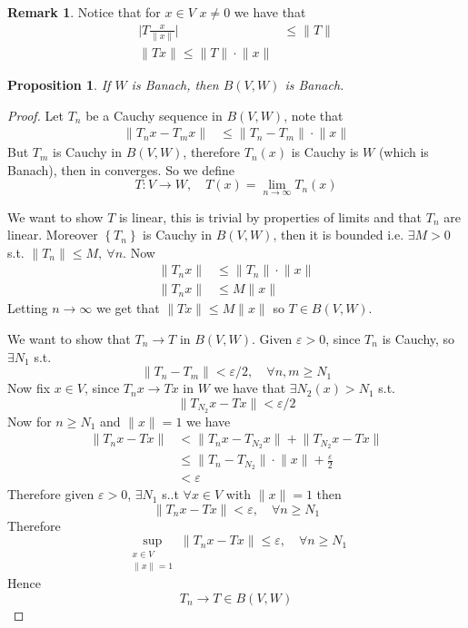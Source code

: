 \documentclass[11pt,a4paper]{article}
\theoremstyle{definition}
\newtheorem{remark}[definition]{Remark}
\theoremstyle{plain}
\newtheorem{proposition}[definition]{Proposition}
\theoremstyle{remark}
\renewcommand{\set}[1]{\left\{ #1 \right\}}
\newcommand{\abs}[1]{\lvert #1 \rvert}
\newcommand{\norm}[1]{\lVert #1 \rVert}
\newcommand{\1}{\mathbbm{1}}
\begin{document}
\begin{remark}
    Notice that for $x \in V$ $x \ne 0$ we have that 
    \begin{align*}
        \abs{T \frac{x}{\norm{x}}} &\le \norm{T} \\
        \norm{Tx} \le \norm{T} \cdot \norm{x}
    \end{align*}
\end{remark}

\begin{proposition}
    If $W$ is Banach, then $B(V, W)$ is Banach.
\end{proposition}

\begin{proof}
    Let $T_n$ be a Cauchy sequence in $B(V,W)$, note that 
    \begin{align*}
        \norm{T_n x - T_m x} &\le \norm{T_n - T_m} \cdot \norm{x}
    \end{align*}
    But $T_m$ is Cauchy in $B(V,W)$, therefore $T_n(x)$ is Cauchy is $W$ (which is Banach), then in converges. So we define 
    $$T \colon V \to W, \quad T(x) = \lim_{n \to \infty} T_n(x)$$

    We want to show $T$ is linear, this is trivial by properties of limits and that $T_n$ are linear. Moreover $\set{T_n}$ is Cauchy 
    in $B(V,W)$, then it is bounded i.e. $\exists M > 0$ s.t. $\norm{T_n} \le M, \ \forall n$. Now 
    \begin{align*}
        \norm{T_nx} &\le \norm{T_n} \cdot \norm{x} \\
        \norm{T_nx} &\le M \norm{x}
    \end{align*} 
    Letting $n \to \infty$ we get that $\norm{Tx} \le M \norm{x}$ so $T \in B(V,W)$.
    
    We want to show that $T_n \to T$ in $B(V,W)$. Given $\varepsilon > 0$, since $T_n$ is Cauchy, so $\exists N_1$ s.t. 
    $$\norm{T_n - T_m} < \varepsilon/2, \quad \forall n,m \ge N_1$$
    Now fix $x \in V$, since $T_n x \to T x$ in $W$ we have that $\exists N_2(x) > N_1$ s.t. 
    $$\norm{T_{N_2} x - Tx} < \varepsilon/2$$
    Now for $n \ge N_1$ and $\norm{x} = 1$ we have  
    \begin{align*}
        \norm{T_nx - Tx} &< \norm{T_n x - T_{N_2} x} + \norm{T_{N_2} x - Tx} \\
        &\le \norm{T_n - T_{N_2}} \cdot \norm{x} + \frac{\varepsilon}{2} \\
        &< \varepsilon
    \end{align*}
    Therefore given $\varepsilon > 0$, $\exists N_1$ s..t $\forall x \in V$ with $\norm{x} = 1$ then 
    $$\norm{T_n x - Tx} < \varepsilon, \quad \forall n \ge N_1$$
    Therefore 
    $$\sup_{\substack{x \in V \\ \norm{x} = 1}} \norm{T_nx - T x} \le \varepsilon, \quad \forall n \ge N_1$$
    Hence 
    $$T_n \to T \in B(V, W)$$
\end{proof}
\end{document}
